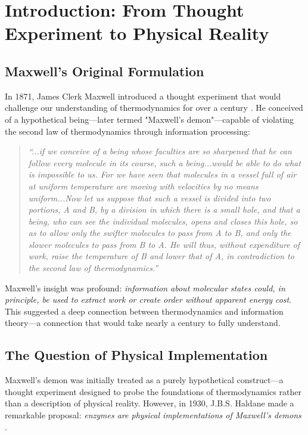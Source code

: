 

\section{Introduction: From Thought Experiment to Physical Reality}

\subsection{Maxwell's Original Formulation}

In 1871, James Clerk Maxwell introduced a thought experiment that would challenge our understanding of thermodynamics for over a century \cite{maxwell1871theory}. He conceived of a hypothetical being—later termed "Maxwell's demon"—capable of violating the second law of thermodynamics through information processing:

\begin{quote}
\textit{``...if we conceive of a being whose faculties are so sharpened that he can follow every molecule in its course, such a being...would be able to do what is impossible to us. For we have seen that molecules in a vessel full of air at uniform temperature are moving with velocities by no means uniform...Now let us suppose that such a vessel is divided into two portions, A and B, by a division in which there is a small hole, and that a being, who can see the individual molecules, opens and closes this hole, so as to allow only the swifter molecules to pass from A to B, and only the slower molecules to pass from B to A. He will thus, without expenditure of work, raise the temperature of B and lower that of A, in contradiction to the second law of thermodynamics.''}
\end{quote}

Maxwell's insight was profound: \textit{information about molecular states could, in principle, be used to extract work or create order without apparent energy cost}. This suggested a deep connection between thermodynamics and information theory—a connection that would take nearly a century to fully understand.

\subsection{The Question of Physical Implementation}

Maxwell's demon was initially treated as a purely hypothetical construct—a thought experiment designed to probe the foundations of thermodynamics rather than a description of physical reality. However, in 1930, J.B.S. Haldane made a remarkable proposal: \textit{enzymes are physical implementations of Maxwell's demons} \cite{haldane1930enzymes}.

